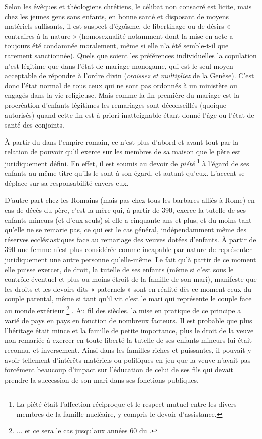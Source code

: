  Selon les évêques et théologiens chrétiens, le célibat non consacré est licite, mais chez les jeunes gens sans enfants, en bonne santé et disposant de moyens matériels suffisants, il est suspect d'égoïsme, de libertinage ou de désirs « contraires à la nature » (homosexualité notamment dont la mise en acte a toujours été condamnée moralement, même si elle n'a été semble-t-il que rarement sanctionnée). Quels que soient les préférences individuelles la copulation n'est légitime que dans l'état de mariage monogame, qui est le seul moyen acceptable de répondre à l'ordre divin (\emph{croissez et multipliez} de la Genèse). C'est donc l'état normal de tous ceux qui ne sont pas ordonnés à un ministère ou engagés dans la vie religieuse. Mais comme la fin première du mariage est la procréation d'enfants légitimes les remariages sont déconseillés (quoique autorisés) quand cette fin est à priori inatteignable étant donné l'âge ou l'état de santé des conjoints. 

 À partir du  dans l'empire romain, ce n'est plus d'abord et avant tout par la relation de pouvoir qu'il exerce sur les membres de sa maison que le père est juridiquement défini. En effet, il est soumis au devoir de \emph{piété}%
\footnote{La piété était l'affection réciproque et le respect mutuel entre les divers membres de la famille nucléaire, y compris le devoir d'assistance.} 
à l'égard de ses enfants au même titre qu'ils le sont à son égard, et autant qu'eux. L'accent se déplace sur sa responsabilité envers eux. 

D'autre part chez les Romains (mais pas chez tous les barbares alliés à Rome) en cas de décès du père, c'est la mère qui, à partir de 390, exerce la tutelle de ses enfants mineurs (et d'eux seuls) si elle a cinquante ans et plus, et du moins tant qu'elle ne se remarie pas, ce qui est le cas général, indépendamment même des réserves ecclésiastiques face au remariage des veuves dotées d'enfants. À partir de 390 une femme n'est plus considérée comme incapable par nature de représenter juridiquement une autre personne qu'elle-même. Le fait qu'à partir de ce moment elle puisse exercer, de droit, la tutelle de ses enfants (même si c'est sous le contrôle éventuel et plus ou moins étroit de la famille de son mari), manifeste que les droits et les devoirs dits « paternels » sont en réalité dès ce moment ceux du couple parental, même si tant qu'il vit c'est le mari qui représente le couple face au monde extérieur%
\footnote{... et ce sera le cas jusqu'aux années 60 du .}%
. Au fil des siècles, la mise en pratique de ce principe a varié de pays en pays en fonction de nombreux facteurs. Il est probable que plus l'héritage était mince et la famille de petite importance, plus le droit de la veuve non remariée à exercer en toute liberté la tutelle de ses enfants mineurs lui était reconnu, et inversement. Ainsi dans les familles riches et puissantes, il pouvait y avoir tellement d'intérêts matériels ou politiques en jeu que la veuve n'avait pas forcément beaucoup d'impact sur l'éducation de celui de ses fils qui devait prendre la succession de son mari dans ses fonctions publiques. 

